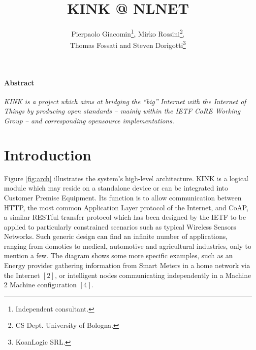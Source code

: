 \documentclass[12pt]{article}
\title{KINK @ NLNET}
\author{Pierpaolo Giacomin\footnote{Independent consultant.}, Mirko Rossini\footnote{CS Dept. University of Bologna.},\\Thomas Fossati and Steven Dorigotti\footnote{KoanLogic SRL.}}
\begin{document}
\maketitle
\tableofcontents

\paragraph{Abstract}
\emph{KINK is a project which aims at bridging the ``big'' Internet with the Internet of Things by producing open standards -- mainly within the IETF CoRE Working Group -- and corresponding \mbox{opensource} implementations.}\\

\section{Introduction}
\label{sec:intro}

Figure \ref{fig:arch} illustrates the system's high-level architecture. KINK is a logical module which may reside on a standalone device or can be integrated into Customer Premise Equipment. Its function is to allow communication between HTTP, the most common Application Layer protocol of the Internet, and CoAP, a similar RESTful transfer protocol which has been designed by the IETF to be applied to particularly constrained scenarios such as typical Wireless Sensors Networks. Such generic design can find an infinite number of applications, ranging from domotics to medical, automotive and agricultural industries, only to mention a few. The diagram shows some more specific examples, such as an Energy provider gathering information from Smart Meters in a home network via the Internet $[2]$, or intelligent nodes communicating independently in a Machine 2 Machine configuration $[4]$.
\end{document}
